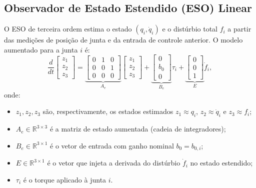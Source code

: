 \subsection{Observador de Estado Estendido (ESO) Linear}

O ESO de terceira ordem estima o estado $(q_i, \dot{q}_i)$ e o distúrbio total $f_i$ a partir das medições de posição de junta e da entrada de controle anterior. O modelo aumentado para a junta $i$ é:
\begin{equation}
    \frac{d}{dt}\begin{bmatrix}z_1\\z_2\\z_3\end{bmatrix} = \underbrace{\begin{bmatrix}0&1&0\\0&0&1\\0&0&0\end{bmatrix}}_{A_e}\begin{bmatrix}z_1\\z_2\\z_3\end{bmatrix} + \underbrace{\begin{bmatrix}0\\b_0\\0\end{bmatrix}}_{B_e}\tau_i + \underbrace{\begin{bmatrix}0\\0\\1\end{bmatrix}}_{E}\dot{f}_i,
    \label{eq:eso_cont}
\end{equation}
onde:
\begin{itemize}
    \item $z_1, z_2, z_3$ são, respectivamente, os estados estimados $z_1 \approx q_i$, $z_2 \approx \dot{q}_i$ e $z_3 \approx f_i$;
    \item $A_e \in \mathbb{R}^{3 \times 3}$ é a matriz de estado aumentada (cadeia de integradores);
    \item $B_e \in \mathbb{R}^{3 \times 1}$ é o vetor de entrada com ganho nominal $b_0 = b_{0,i}$;
    \item $E \in \mathbb{R}^{3 \times 1}$ é o vetor que injeta a derivada do distúrbio $\dot{f}_i$ no estado estendido;
    \item $\tau_i$ é o torque aplicado à junta $i$.
\end{itemize}

